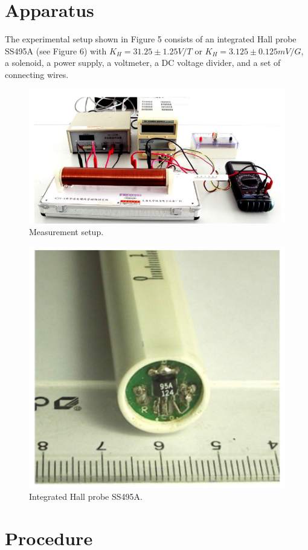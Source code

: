 \documentclass[12pt]{article}
\begin{document}
\section{Apparatus}
The experimental setup shown in Figure 5 consists of an integrated Hall probe SS495A
(see Figure 6) with $K_H = 31.25\pm1.25V/T$ or $K_H=3.125\pm0.125mV/G$, a solenoid, a
power supply, a voltmeter, a DC voltage divider, and a set of connecting wires.
\begin{figure}[H]
\centering
\includegraphics[scale=0.4]{P5.jpg}
\caption{Measurement setup.}
\end{figure}
\begin{figure}[H]
\centering
\includegraphics[scale=0.4]{P6.jpg}
\caption{Integrated Hall probe SS495A.}
\end{figure}
\section{Procedure}
\end{document}

